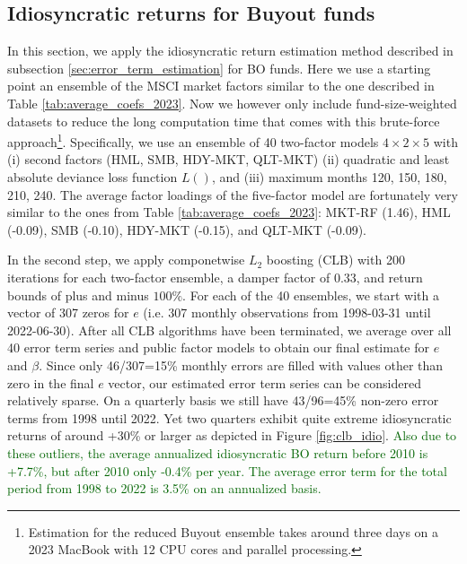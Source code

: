 \documentclass[12pt]{article}
\begin{document}
\subsection{Idiosyncratic returns for Buyout funds}
\label{sec:idiosyncratic_BO}

In this section, we apply the idiosyncratic return estimation method described in subsection \ref{sec:error_term_estimation} for BO funds.
Here we use a starting point an ensemble of the MSCI market factors similar to the one described in Table \ref{tab:average_coefs_2023}.
Now we however only include fund-size-weighted datasets to reduce the long computation time that comes with this brute-force approach\footnote{Estimation for the reduced Buyout ensemble takes around three days on a 2023 MacBook with 12 CPU cores and parallel processing.}.
Specifically, we use an ensemble of 40 two-factor models $4 \times 2 \times 5$  with (i) second factors (HML, SMB, HDY-MKT, QLT-MKT) (ii) quadratic and least absolute deviance loss function $L()$, and (iii) maximum months 120, 150, 180, 210, 240.
The average factor loadings of the five-factor model are fortunately very similar to the ones from Table \ref{tab:average_coefs_2023}:  
MKT-RF (1.46), 
HML (-0.09), 
SMB (-0.10), 
HDY-MKT (-0.15), and 
QLT-MKT (-0.09).

In the second step, we apply componetwise $L_2$ boosting (CLB) with 200 iterations for each two-factor ensemble, a damper factor of 0.33, and return bounds of plus and minus $100\%$.
For each of the 40 ensembles, we start with a vector of 307 zeros for $e$  (i.e. 307 monthly observations from 1998-03-31 until 2022-06-30).
After all CLB algorithms have been terminated, we average over all 40 error term series and public factor models to obtain our final estimate for $e$ and $\beta$.
Since only 46/307=15\% monthly errors are filled with values other than zero in the final $e$ vector, our estimated error term series can be considered relatively sparse.
On a quarterly basis we still have 43/96=45\% non-zero error terms from 1998 until 2022.
Yet two quarters exhibit quite extreme idiosyncratic returns of around +30\% or larger as depicted in Figure \ref{fig:clb_idio}.
\textcolor{darkgreen}{
Also due to these outliers, the average annualized idiosyncratic BO return before 2010 is +7.7\%, but after 2010 only -0.4\% per year.
The average error term for the total period from 1998 to 2022 is 3.5\% on an annualized basis.
}
\end{document}
